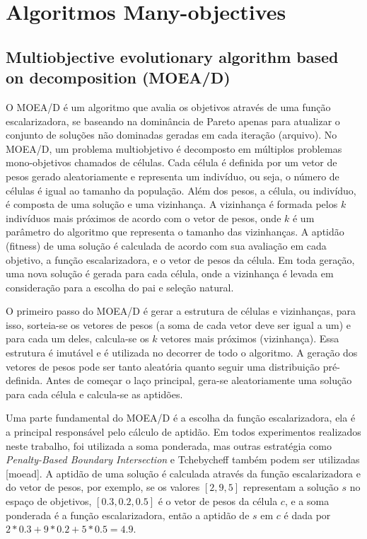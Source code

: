 \section{Algoritmos Many-objectives}

\subsection{Multiobjective evolutionary algorithm based on decomposition (MOEA/D)}

O MOEA/D é um algoritmo que avalia os objetivos através de uma função escalarizadora, se baseando na dominância de Pareto apenas para atualizar o conjunto de soluções não dominadas geradas em cada iteração (arquivo). No MOEA/D, um problema multiobjetivo é decomposto em múltiplos problemas mono-objetivos chamados de células. Cada célula é definida por um vetor de pesos gerado aleatoriamente e representa um indivíduo, ou seja, o número de células é igual ao tamanho da população. Além dos pesos, a célula, ou indivíduo, é composta de uma solução e uma vizinhança. A vizinhança é formada pelos $k$ indivíduos mais próximos de acordo com o vetor de pesos, onde $k$ é um parâmetro do algoritmo que representa o tamanho das vizinhanças. A aptidão (fitness) de uma solução é calculada de acordo com sua avaliação em cada objetivo, a função escalarizadora, e o vetor de pesos da célula. Em toda geração, uma nova solução é gerada para cada célula, onde a vizinhança é levada em consideração para a escolha do pai e seleção natural.

O primeiro passo do MOEA/D é gerar a estrutura de células e vizinhanças, para isso, sorteia-se os vetores de pesos (a soma de cada vetor deve ser igual a um) e para cada um deles, calcula-se os $k$ vetores mais próximos (vizinhança). Essa estrutura é imutável e é utilizada no decorrer de todo o algoritmo. A geração dos vetores de pesos pode ser tanto aleatória quanto seguir uma distribuição pré-definida. Antes de começar o laço principal, gera-se aleatoriamente uma solução para cada célula e calcula-se as aptidões. 

Uma parte fundamental do MOEA/D é a escolha da função escalarizadora, ela é a principal responsável pelo cálculo de aptidão. Em todos experimentos realizados neste trabalho, foi utilizada a soma ponderada, mas outras estratégia como \textit{Penalty-Based Boundary Intersection} e Tchebycheff também podem ser utilizadas [moead]. A aptidão de uma solução é calculada através da função escalarizadora e do vetor de pesos, por exemplo, se os valores $[2, 9, 5]$ representam a solução $s$ no espaço de objetivos, $[0.3, 0.2, 0.5]$ é o vetor de pesos da célula $c$, e a soma ponderada é a função escalarizadora, então a aptidão de $s$ em $c$ é dada por $2 * 0.3 + 9 * 0.2 + 5 * 0.5 = 4.9$.

